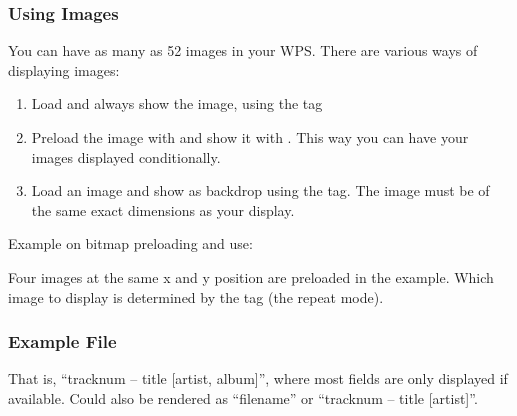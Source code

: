 \subsubsection{Using Images}
You can have as many as 52 images in your WPS. There are various ways of
displaying images:
\begin{enumerate}
  \item Load and always show the image, using the  tag
  \item Preload the image with  and show it with .
    This way you can have your images displayed conditionally.
  \item Load an image and show as backdrop using the  tag. The
    image must be of the same exact dimensions as your display.
\end{enumerate}

%

Example on bitmap preloading and use:
\begin{example}
\end{example}
Four images at the same x and y position are preloaded in the example. Which
image to display is determined by the  tag (the repeat mode).

\subsubsection{Example File}
\begin{example}
\end{example}
That is, ``tracknum -- title [artist, album]'', where most fields are only
displayed if available. Could also be rendered as ``filename'' or ``tracknum --
title [artist]''.

%
%

